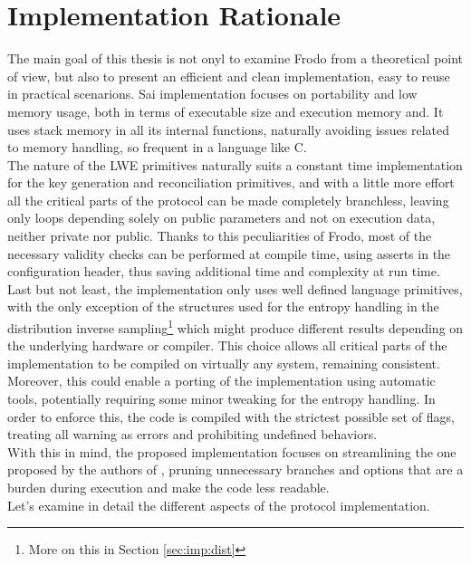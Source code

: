 \section{Implementation Rationale}
The main goal of this thesis is not onyl to examine Frodo from a theoretical point of view, but also to present an efficient and clean implementation, easy to reuse in practical scenarions. Sai implementation focuses on portability and low memory usage, both in terms of executable size and execution memory and. It uses stack memory in all its internal functions, naturally avoiding issues related to memory handling, so frequent in a language like C.\\
The nature of the LWE primitives naturally suits a constant time implementation for the key generation and reconciliation primitives, and with a little more effort all the critical parts of the protocol can be made completely branchless, leaving only loops depending solely on public parameters and not on execution data, neither private nor public. Thanks to this peculiarities of Frodo, most of the necessary validity checks can be performed at compile time, using asserts in the configuration header, thus saving additional time and complexity at run time.\\
Last but not least, the implementation only uses well defined language primitives, with the only exception of the structures used for the entropy handling in the distribution inverse sampling\footnote{More on this in Section \ref{sec:imp:dist}} which might produce different results depending on the underlying hardware or compiler. This choice allows all critical parts of the implementation to be compiled on virtually any system, remaining consistent. Moreover, this could enable a porting of the implementation using automatic tools, potentially requiring some minor tweaking for the entropy handling. In order to enforce this, the code is compiled with the strictest possible set of flags, treating all warning as errors and prohibiting undefined behaviors.\\
With this in mind, the proposed implementation focuses on streamlining the one proposed by the authors of \cite{frodo}, pruning unnecessary branches and options that are a burden during execution and make the code less readable.\\
Let's examine in detail the different aspects of the protocol implementation.


